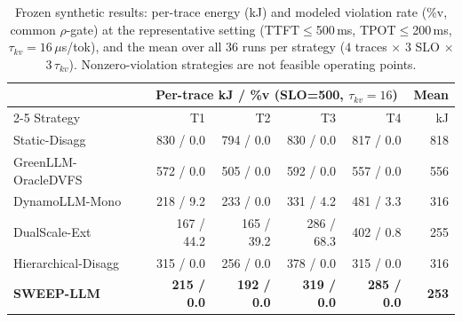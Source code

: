 

\begin{table}[t]
\centering
\caption{Frozen synthetic results: per-trace energy (kJ) and modeled violation rate (\%v, common $\rho$-gate) at the representative setting (TTFT$\leq$500\,ms, TPOT$\leq$200\,ms, $\tau_{kv}{=}16\,\mu$s/tok), and the mean over all $36$ runs per strategy ($4$ traces $\times$ $3$ SLO $\times$ $3\,\tau_{kv}$). Nonzero-violation strategies are not feasible operating points.}
\label{tab:section42_main}
\small
\setlength{\tabcolsep}{4pt}
\begin{tabular}{@{}lrrrrr@{}}
\toprule
 & \multicolumn{4}{c}{Per-trace kJ / \%v (SLO=500, $\tau_{kv}{=}16$)} & Mean \\
\cmidrule(lr){2-5}
Strategy & T1 & T2 & T3 & T4 & kJ \\
\midrule
Static-Disagg          & 830 / 0.0 & 794 / 0.0 & 830 / 0.0 & 817 / 0.0 & 818 \\
GreenLLM-OracleDVFS    & 572 / 0.0 & 505 / 0.0 & 592 / 0.0 & 557 / 0.0 & 556 \\
DynamoLLM-Mono         & 218 / 9.2 & 233 / 0.0 & 331 / 4.2 & 481 / 3.3 & 316 \\
DualScale-Ext          & 167 / 44.2 & 165 / 39.2 & 286 / 68.3 & 402 / 0.8 & 255 \\
Hierarchical-Disagg    & 315 / 0.0 & 256 / 0.0 & 378 / 0.0 & 315 / 0.0 & 316 \\
\textbf{SWEEP-LLM}     & \textbf{215 / 0.0} & \textbf{192 / 0.0} & \textbf{319 / 0.0} & \textbf{285 / 0.0} & \textbf{253} \\
\bottomrule
\end{tabular}
\end{table}

